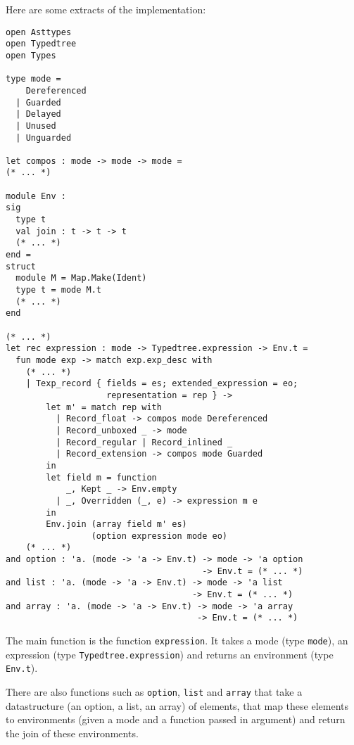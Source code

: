 \documentclass{article}
\begin{document}
Here are some extracts of the implementation:
\begin{lstlisting}
open Asttypes
open Typedtree
open Types

type mode =
    Dereferenced
  | Guarded
  | Delayed
  | Unused
  | Unguarded

let compos : mode -> mode -> mode =
(* ... *)

module Env :
sig
  type t
  val join : t -> t -> t
  (* ... *)
end =
struct
  module M = Map.Make(Ident)
  type t = mode M.t
  (* ... *)
end

(* ... *)
let rec expression : mode -> Typedtree.expression -> Env.t =
  fun mode exp -> match exp.exp_desc with
    (* ... *)
    | Texp_record { fields = es; extended_expression = eo;
                    representation = rep } ->
        let m' = match rep with
          | Record_float -> compos mode Dereferenced
          | Record_unboxed _ -> mode
          | Record_regular | Record_inlined _
          | Record_extension -> compos mode Guarded
        in
        let field m = function
            _, Kept _ -> Env.empty
          | _, Overridden (_, e) -> expression m e
        in
        Env.join (array field m' es)
                 (option expression mode eo)
    (* ... *)
and option : 'a. (mode -> 'a -> Env.t) -> mode -> 'a option
                                       -> Env.t = (* ... *)
and list : 'a. (mode -> 'a -> Env.t) -> mode -> 'a list
                                     -> Env.t = (* ... *)
and array : 'a. (mode -> 'a -> Env.t) -> mode -> 'a array
                                      -> Env.t = (* ... *)
\end{lstlisting}

The main function is the function \lstinline|expression|. It takes a mode (type
\lstinline|mode|), an expression (type \lstinline|Typedtree.expression|) and
returns an environment (type \lstinline|Env.t|).

There are also functions such as \lstinline|option|, \lstinline|list| and
\lstinline|array| that take a datastructure (an option, a list, an array) of
elements, that map these elements to environments (given a mode and a function
passed in argument) and return the join of these environments.



\end{document}
